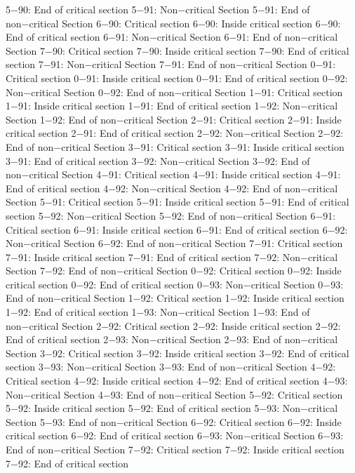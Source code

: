 5−90: End of critical section
5−91: Non−critical Section
5−91: End of non−critical Section
6−90: Critical section
6−90: Inside critical section
6−90: End of critical section
6−91: Non−critical Section
6−91: End of non−critical Section
7−90: Critical section
7−90: Inside critical section
7−90: End of critical section
7−91: Non−critical Section
7−91: End of non−critical Section
0−91: Critical section
0−91: Inside critical section
0−91: End of critical section
0−92: Non−critical Section
0−92: End of non−critical Section
1−91: Critical section
1−91: Inside critical section
1−91: End of critical section
1−92: Non−critical Section
1−92: End of non−critical Section
2−91: Critical section
2−91: Inside critical section
2−91: End of critical section
2−92: Non−critical Section
2−92: End of non−critical Section
3−91: Critical section
3−91: Inside critical section
3−91: End of critical section
3−92: Non−critical Section
3−92: End of non−critical Section
4−91: Critical section
4−91: Inside critical section
4−91: End of critical section
4−92: Non−critical Section
4−92: End of non−critical Section
5−91: Critical section
5−91: Inside critical section
5−91: End of critical section
5−92: Non−critical Section
5−92: End of non−critical Section
6−91: Critical section
6−91: Inside critical section
6−91: End of critical section
6−92: Non−critical Section
6−92: End of non−critical Section
7−91: Critical section
7−91: Inside critical section
7−91: End of critical section
7−92: Non−critical Section
7−92: End of non−critical Section
0−92: Critical section
0−92: Inside critical section
0−92: End of critical section
0−93: Non−critical Section
0−93: End of non−critical Section
1−92: Critical section
1−92: Inside critical section
1−92: End of critical section
1−93: Non−critical Section
1−93: End of non−critical Section
2−92: Critical section
2−92: Inside critical section
2−92: End of critical section
2−93: Non−critical Section
2−93: End of non−critical Section
3−92: Critical section
3−92: Inside critical section
3−92: End of critical section
3−93: Non−critical Section
3−93: End of non−critical Section
4−92: Critical section
4−92: Inside critical section
4−92: End of critical section
4−93: Non−critical Section
4−93: End of non−critical Section
5−92: Critical section
5−92: Inside critical section
5−92: End of critical section
5−93: Non−critical Section
5−93: End of non−critical Section
6−92: Critical section
6−92: Inside critical section
6−92: End of critical section
6−93: Non−critical Section
6−93: End of non−critical Section
7−92: Critical section
7−92: Inside critical section
7−92: End of critical section
